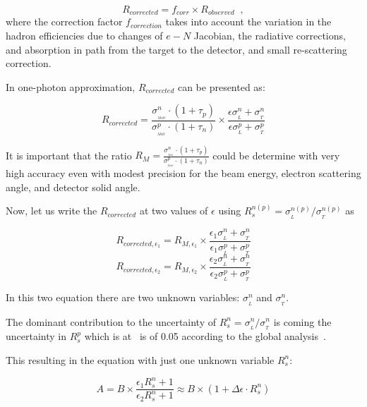 \begin{equation}
R_{corrected} = f_{corr} \times R_{observed} \;\; ,
\label{eq:2}
\end{equation}
where the correction factor $f_{correction}$ takes into account the variation in the hadron efficiencies due to changes of $e-N$ Jacobian, the radiative corrections, and absorption in path
from the target to the detector, and small re-scattering correction.

In one-photon approximation, $R_{corrected}$ can be presented as: 

\begin{equation}
R_{corrected} = \frac {\sigma_{_{_{Mott}}}^n \cdot (1+\tau_p)}{\sigma_{_{_{Mott}}}^p \cdot (1+\tau_n)} \times \frac{\epsilon \sigma_{_L}^n + \sigma_{_T}^n}{\epsilon \sigma_{_L}^p + \sigma_{_T}^p}
\end{equation}

It is important that the ratio $R_M = \frac {\sigma_{_{_{Mott}}}^n \cdot (1+\tau_p)}{\sigma_{_{_{Mott}}}^p \cdot (1+\tau_n)}$ could be determine with very high accuracy even
with modest precision for the beam energy, electron scattering angle, and detector solid angle.


Now, let us write the $R_{corrected}$ at two values of $\epsilon$ using $R_s^{n(p)} = \sigma_{_L}^{n(p)}/ \sigma_{_T}^{n(p)}$ as

\begin{equation*}
R_{{corrected},\epsilon_1} = R_{M,\epsilon_1} \times \frac{\epsilon_1 \sigma_{_L}^n + \sigma_{_T}^n}{\epsilon_1 \sigma_{_L}^p + \sigma_{_T}^p}
\end{equation*}
\begin{equation*}
R_{{corrected},\epsilon_2} = R_{M,\epsilon_2} \times \frac{\epsilon_2 \sigma_{_L}^n + \sigma_{_T}^n}{\epsilon_2 \sigma_{_L}^p + \sigma_{_T}^p}
\end{equation*}

In this two equation there are two unknown variables: $\sigma_{_L}^n$ and $\sigma_{_T}^n$.

The dominant contribution to the uncertainty of $R_s^{n} = \sigma_{_L}^{n}/ \sigma_{_T}^{n}$ is coming the uncertainty in $R_s^{p}$ which is at  \gevcsq~is of 0.05 
according to the global analysis~\cite{Christy2020ab}.

This resulting in the equation with just one unknown variable $R_s^n$:

\begin{equation*}
A = B \times \frac{\epsilon_1 R_s^n + 1}{\epsilon_2 R_s^n  + 1} \approx B \times (1 + \Delta \epsilon \cdot R_s^n)
\end{equation*}

